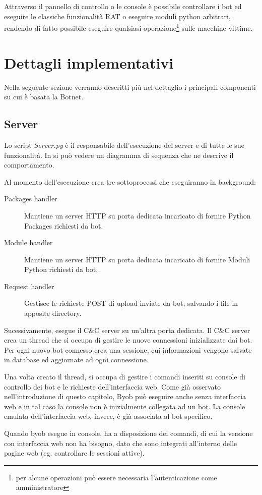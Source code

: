 Attraverso il pannello di controllo o le console è possibile controllare i bot ed eseguire le classiche funzionalità RAT o eseguire moduli python arbitrari, rendendo di fatto possibile eseguire qualsiasi operazione\footnote{per alcune operazioni può essere necessaria l'autenticazione come amministratore} sulle macchine vittime.


\section{Dettagli implementativi}
Nella seguente sezione verranno descritti più nel dettaglio i principali componenti su cui è basata la Botnet.

\subsection{Server}
Lo script \textit{Server.py} è il responsabile dell'esecuzione del server e di tutte le sue funzionalità. In  si può vedere un diagramma di sequenza che ne descrive il comportamento.

Al momento dell'esecuzione crea tre sottoprocessi che eseguiranno in background:
\begin{description}
    \item[Packages handler] Mantiene un server HTTP su porta dedicata incaricato di fornire Python Packages richiesti da bot.
    \item[Module handler] Mantiene un server HTTP su porta dedicata incaricato di fornire Moduli Python richiesti da bot.
    \item[Request handler] Gestisce le richieste POST di upload  inviate da bot, salvando i file in apposite directory.
\end{description}
Sucessivamente, esegue il C\&C server su un'altra porta dedicata.
Il C\&C server crea un thread che si occupa di gestire le nuove connessioni inizializzate dai bot. Per ogni nuovo bot connesso crea una sessione, cui informazioni vengono salvate in database ed aggiornate ad ogni connessione. 

Una volta creato il thread, si occupa di gestire i comandi inseriti su console di controllo dei bot e le richieste  dell'interfaccia web.
Come già osservato nell'introduzione di questo capitolo, Byob può eseguire anche senza interfaccia web e in tal caso la console non è inizialmente collegata ad un bot. La console emulata dell'interfaccia web, invece, è già associata al bot specifico. 

Quando byob esegue in console, ha a disposizione dei comandi, di cui la versione con interfaccia web non ha bisogno, dato che sono integrati all'interno delle pagine web (eg. controllare le sessioni attive).

